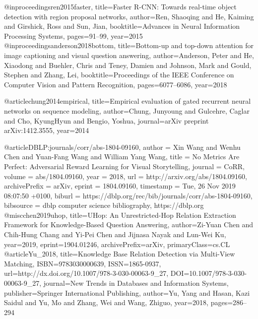 @inproceedings{ren2015faster,
  title={{Faster R-CNN}: Towards real-time object detection with region proposal networks},
  author={Ren, Shaoqing and He, Kaiming and Girshick, Ross and Sun, Jian},
  booktitle={Advances in Neural Information Processing Systems},
  pages={91--99},
  year={2015}
}
@inproceedings{anderson2018bottom,
  title={Bottom-up and top-down attention for image captioning and visual question answering},
  author={Anderson, Peter and He, Xiaodong and Buehler, Chris and Teney, Damien and Johnson, Mark and Gould, Stephen and Zhang, Lei},
  booktitle={Proceedings of the IEEE Conference on Computer Vision and Pattern Recognition},
  pages={6077--6086},
  year={2018}
}

@article{chung2014empirical,
  title={Empirical evaluation of gated recurrent neural networks on sequence modeling},
  author={Chung, Junyoung and Gulcehre, Caglar and Cho, KyungHyun and Bengio, Yoshua},
  journal={arXiv preprint arXiv:1412.3555},
  year={2014}
}


@article{DBLP:journals/corr/abs-1804-09160,
  author    = {Xin Wang and
               Wenhu Chen and
               Yuan{-}Fang Wang and
               William Yang Wang},
  title     = {No Metrics Are Perfect: Adversarial Reward Learning for Visual Storytelling},
  journal   = {CoRR},
  volume    = {abs/1804.09160},
  year      = {2018},
  url       = {http://arxiv.org/abs/1804.09160},
  archivePrefix = {arXiv},
  eprint    = {1804.09160},
  timestamp = {Tue, 26 Nov 2019 08:07:50 +0100},
  biburl    = {https://dblp.org/rec/bib/journals/corr/abs-1804-09160},
  bibsource = {dblp computer science bibliography, https://dblp.org}
}
@misc{chen2019uhop,
    title={{UHop}: An Unrestricted-Hop Relation Extraction Framework for Knowledge-Based Question Answering},
    author={Zi-Yuan Chen and Chih-Hung Chang and Yi-Pei Chen and Jijnasa Nayak and Lun-Wei Ku},
    year={2019},
    eprint={1904.01246},
    archivePrefix={arXiv},
    primaryClass={cs.CL}
}
@article{Yu_2018,
   title={Knowledge Base Relation Detection via Multi-View Matching},
   ISBN={9783030000639},
   ISSN={1865-0937},
   url={http://dx.doi.org/10.1007/978-3-030-00063-9_27},
   DOI={10.1007/978-3-030-00063-9_27},
   journal={New Trends in Databases and Information Systems},
   publisher={Springer International Publishing},
   author={Yu, Yang and Hasan, Kazi Saidul and Yu, Mo and Zhang, Wei and Wang, Zhiguo},
   year={2018},
   pages={286–294}
}



